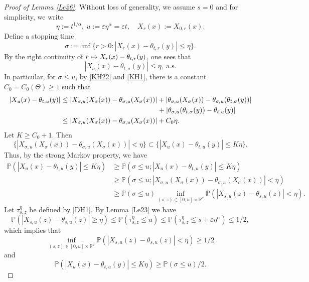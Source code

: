 \documentclass[JEP,XML,SOM,Unicode,published]{cedram}
\def\mto{\mathchoice{\longmapsto}{\mapsto}{\mapsto}{\mapsto}}
\theoremstyle{plain}
\theoremstyle{definition}
\let\eps\varepsilon
\newcommand\mP{\mathbb{P}}
\newcommand\mR{\mathbb{R}}
\newcommand\1{{\mathbf{1}}}
\begin{document}
\begin{proof}[Proof of Lemma \ref{Le26}]
Without loss of generality, we assume $s=0$ and for simplicity, we write
\[
\eta:=t^{1/\alpha},\ u:=\eps\eta^\alpha=\eps t,\quad X_r(x):=X_{0,r}(x).
\]
Define a stopping time
\[
\sigma:=\inf\bigl\{r>0: |X_{r}(x)-\theta_{t,r}(y)|\leq \eta\bigr\}.
\]
By the right continuity of $r\mto X_{r}(x)-\theta_{t,r}(y)$, one sees that
\[
|X_{\sigma}(x)-\theta_{t,\sigma}(y)|\leq \eta, \ \text{a.s.}
\]
In particular, for $\sigma\leq u$, by \eqref{KH22} and \eqref{KH1}, there is a constant $C_0=C_0(\Theta)\geq 1$ such that
\begin{align*}
|X_{u}(x)-\theta_{t,u}(y)|
&\leq |X_{\sigma,u}(X_{\sigma}(x))-\theta_{\sigma,u}(X_{\sigma}(x))|
+|\theta_{\sigma,u}(X_{\sigma}(x))-\theta_{\sigma,u}(\theta_{t,\sigma}(y))|
\\&\hspace*{4.87cm}+|\theta_{\sigma,u}(\theta_{t,\sigma}(y))-\theta_{t,u}(y)|
\\&\leq |X_{\sigma,u}(X_{\sigma}(x))-\theta_{\sigma,u}(X_{\sigma}(x))|+C_0\eta.
\end{align*}
Let $K\geq C_0+1$. Then
\[
\big\{|X_{\sigma,u}(X_{\sigma}(x))-\theta_{\sigma,u}(X_{\sigma}(x))|<\eta\big\}
\subset\big\{|X_{u}(x)-\theta_{t,u}(y)|\leq K\eta\big\}.
\]
Thus, by the strong Markov property, we have
\begin{align*}
\mP(|X_{u}(x)-\theta_{t,u}(y)|\leq K\eta)
&\geq \mP(\sigma\leq u; |X_{u}(x)-\theta_{t,u}(y)|\leq K\eta)
\\&\geq \mP(\sigma\leq u; |X_{\sigma,u}(X_{\sigma}(x))-\theta_{\sigma,u}(X_{\sigma}(x))|<\eta)
\\&\geq \mP(\sigma\leq u)\inf_{(s,z)\in[0,u]\times\mR^d}\mP(|X_{s,u}(z)-\theta_{s,u}(z)|<\eta).
\end{align*}
Let $\tau^\eta_{s,z}$ be defined by \eqref{DH1}.
By Lemma \ref{Le23} we have
\begin{equation}\label{Tau}
\mP\left(|X_{s,u}(z)-\theta_{s,u}(z)|\geq \eta\right)\leq \mP(\tau^\eta_{s,z}\leq u)
\leq \mP(\tau^\eta_{s,z}\leq s+\eps\eta^\alpha)\leq 1/2,
\end{equation}
which implies that
\begin{equation*}
\inf_{(s,z)\in[0,u]\times\mR^d}\mP\left(|X_{s,u}(z)-\theta_{s,u}(z)|<\eta\right)\geq 1/2
\end{equation*}
and
\begin{equation}\label{AA9}
\mP(|X_{u}(x)-\theta_{t,u}(y)|\leq K\eta)\geq \mP(\sigma\leq u)/2.
\end{equation}

\end{proof}
\end{document}
